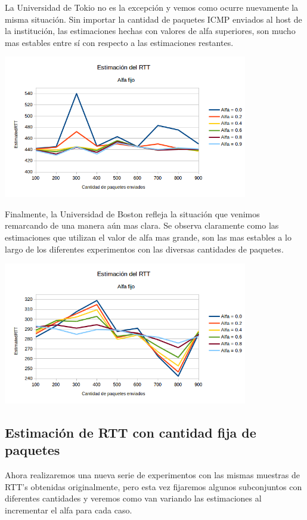 La Universidad de Tokio no es la excepción y vemos como ocurre nuevamente la misma situación. Sin importar la cantidad de paquetes ICMP enviados al host de la institución, las estimaciones hechas con valores de alfa superiores, son mucho mas estables entre sí con respecto a las estimaciones restantes.

\centerline{\includegraphics[width=0.8\textwidth]{imagenes/3ra_parte/ping_varios_alfa_fijo_variando_n_japon2.png}}

Finalmente, la Universidad de Boston refleja la situación que venimos remarcando de una manera aún mas clara. Se observa claramente como las estimaciones que utilizan el valor de alfa mas grande, son las mas estables a lo largo de los diferentes experimentos con las diversas cantidades de paquetes.

\centerline{\includegraphics[width=0.8\textwidth]{imagenes/3ra_parte/ping_varios_alfa_fijo_variando_n_eeuu.png}}

\subsection{Estimación de RTT con cantidad fija de paquetes}

Ahora realizaremos una nueva serie de experimentos con las mismas muestras de RTT's obtenidas originalmente, pero esta vez fijaremos algunos subconjuntos con diferentes cantidades y veremos como van variando las estimaciones al incrementar el alfa para cada caso.

